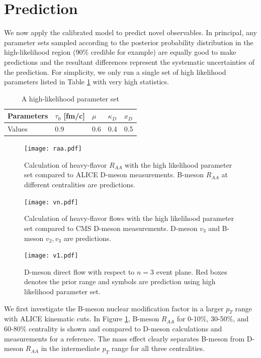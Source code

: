 \documentclass[aps, prc, reprint, amsmath, groupedaddress, nofootinbib]{revtex4-1}
\begin{document}
\section{Prediction}\label{section:prediction}
We now apply the calibrated model to predict novel observables.
In principal, any parameter sets sampled according to the posterior probability distribution in the high-likelihood region (90\% credible for example) are equally good to make predictions and the resultant differences represent the systematic uncertainties of the prediction.
For simplicity, we only run a single set of high likelihood parameters listed in Table \ref{table:high-likelihood-parameters} with very high statistics.
\begin{table}
\caption{A high-likelihood parameter set}\label{table:high-likelihood-parameters}
\begin{tabularx}{\columnwidth}{XXXXX}
\hline
Parameters & $\tau_0$ [fm/c] & $\mu$ & $\kappa_D$ & $x_D$   \\
\hline
Values & 0.9 & 0.6 & 0.4 & 0.5\\
\hline
\end{tabularx}
\end{table} 
\begin{figure}
\texttt{[image: raa.pdf]}
\caption{Calculation of heavy-flavor $R_{AA}$ with the high likelihood parameter set compared to ALICE D-meson measurements. B-meson $R_{AA}$ at different centralities are predictions.}\label{plots:pred:raa}
\end{figure}
\begin{figure}
\texttt{[image: vn.pdf]}
\caption{Calculation of heavy-flavor flows with the high likelihood parameter set compared to CMS D-meson measurements. D-meson $v_3$ and B-meson $v_2, v_3$ are predictions.}\label{plots:pred:vn}
\end{figure}
\begin{figure}
\texttt{[image: v1.pdf]}
\caption{D-meson direct flow with respect to $n=3$ event plane. Red boxes denotes the prior range and symbols are prediction using high likelihood parameter set.}\label{plots:pred:v1}
\end{figure}
We first investigate the B-meson nuclear modification factor in a larger $p_T$ range with ALICE kinematic cuts.
In Figure \ref{plots:pred:raa}, B-meson $R_{AA}$ for 0-10\%, 30-50\%, and 60-80\% centrality is shown and compared to D-meson calculations and measurements for a reference.
The mass effect clearly separates B-meson from D-meson $R_{AA}$ in the intermediate $p_T$ range for all three centralities. 
\end{document}
